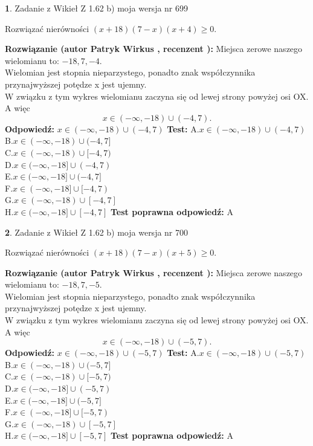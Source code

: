 \documentclass[12pt, a4paper]{article}
\theoremstyle{definition} %
\newtheorem{zad}{}
\newcommand{\zadStart}[1]{\begin{zad}#1\newline}
\newcommand{\zadStop}{\end{zad}}
\newcommand{\rozwStart}[2]{\noindent \textbf{Rozwiązanie (autor #1 , recenzent #2): }\newline}
\newcommand{\rozwStop}{\newline}
\newcommand{\odpStart}{\noindent \textbf{Odpowiedź:}\newline}
\newcommand{\odpStop}{\newline}
\newcommand{\testStart}{\noindent \textbf{Test:}\newline}
\newcommand{\testStop}{\newline}
\newcommand{\kluczStart}{\noindent \textbf{Test poprawna odpowiedź:}\newline}
\newcommand{\kluczStop}{\newline}
\begin{document}
\zadStart{Zadanie z Wikieł Z 1.62 b) moja wersja nr 699}

Rozwiązać nierówności $(x+18)(7-x)(x+4)\ge0$.
\zadStop
\rozwStart{Patryk Wirkus}{}
Miejsca zerowe naszego wielomianu to: $-18, 7, -4$.\\
Wielomian jest stopnia nieparzystego, ponadto znak współczynnika przy\linebreak najwyższej potędze x jest ujemny.\\ W związku z tym wykres wielomianu zaczyna się od lewej strony powyżej osi OX. A więc $$x \in (-\infty,-18) \cup (-4,7).$$
\rozwStop
\odpStart
$x \in (-\infty,-18) \cup (-4,7)$
\odpStop
\testStart
A.$x \in (-\infty,-18) \cup (-4,7)$\\
B.$x \in (-\infty,-18) \cup (-4,7]$\\
C.$x \in (-\infty,-18) \cup [-4,7)$\\
D.$x \in (-\infty,-18] \cup (-4,7)$\\
E.$x \in (-\infty,-18] \cup (-4,7]$\\
F.$x \in (-\infty,-18] \cup [-4,7)$\\
G.$x \in (-\infty,-18) \cup [-4,7]$\\
H.$x \in (-\infty,-18] \cup [-4,7]$
\testStop
\kluczStart
A
\kluczStop



\zadStart{Zadanie z Wikieł Z 1.62 b) moja wersja nr 700}

Rozwiązać nierówności $(x+18)(7-x)(x+5)\ge0$.
\zadStop
\rozwStart{Patryk Wirkus}{}
Miejsca zerowe naszego wielomianu to: $-18, 7, -5$.\\
Wielomian jest stopnia nieparzystego, ponadto znak współczynnika przy\linebreak najwyższej potędze x jest ujemny.\\ W związku z tym wykres wielomianu zaczyna się od lewej strony powyżej osi OX. A więc $$x \in (-\infty,-18) \cup (-5,7).$$
\rozwStop
\odpStart
$x \in (-\infty,-18) \cup (-5,7)$
\odpStop
\testStart
A.$x \in (-\infty,-18) \cup (-5,7)$\\
B.$x \in (-\infty,-18) \cup (-5,7]$\\
C.$x \in (-\infty,-18) \cup [-5,7)$\\
D.$x \in (-\infty,-18] \cup (-5,7)$\\
E.$x \in (-\infty,-18] \cup (-5,7]$\\
F.$x \in (-\infty,-18] \cup [-5,7)$\\
G.$x \in (-\infty,-18) \cup [-5,7]$\\
H.$x \in (-\infty,-18] \cup [-5,7]$
\testStop
\kluczStart
A
\kluczStop
\end{document}
